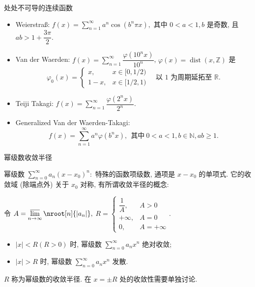 
\begin{frame}{处处不可导的连续函数}

\begin{itemize}[<+->]
\item Weierstra\ss: $f(x) = \sum\limits_{n=1}^\infty a^n \cos(b^n \pi x),$ 其中 $0 < a < 1, b$ 是奇数, 且 $ab > 1 + \dfrac{3\pi}{2}.$
\item Van der Waerden: $f(x) = \sum\limits_{n=1}^\infty \dfrac{\varphi(10^n x)}{10^n}$, $\varphi(x) = \operatorname{dist}(x, \mathbb{Z})$ 是
\[\varphi_0(x) = \begin{cases} x, & x \in [0, 1/2) \\ 1-x, & x \in [1/2, 1) \end{cases} \quad \text{以 $1$ 为周期延拓至 $\mathbb{R}$}.\]
\item Teiji Takagi: $f(x) = \sum\limits_{n=1}^\infty \dfrac{\varphi(2^n x)}{2^n}.$
\item Generalized Van der Waerden-Takagi:
\[f(x) = \sum\limits_{n=1}^\infty a^n \varphi(b^n x), ~~ \text{其中} ~ 0 < a < 1, b \in \mathbb{N}, ab \geqslant 1.\]
\end{itemize}

\end{frame}


\begin{frame}{幂级数收敛半径}

幂级数 $\sum\limits_{n=0}^\infty a_n (x-x_0)^n:$ 特殊的函数项级数, 通项是 $x-x_0$ 的单项式. 它的收敛域 (除端点外) 关于 $x_0$ 对称, 有所谓\alert{收敛半径}的概念:

\pause

\begin{thm}
令 $A = \varlimsup\limits_{n\to\infty} \nroot[n]{\lvert a_n \rvert},$ $R = \begin{cases} \dfrac{1}{A}, & A > 0 \\ +\infty, & A = 0 \\ 0, & A = +\infty \end{cases}.$
\begin{itemize}
\item $\lvert x \rvert < R (R > 0)$ 时, 幂级数 $\sum\limits_{n=0}^\infty a_n x^n$ 绝对收敛;
\item $\lvert x \rvert > R$ 时, 幂级数 $\sum\limits_{n=0}^\infty a_n x^n$ 发散.
\end{itemize}
\end{thm}

\pause

$R$ 称为幂级数的收敛半径. 在 $x = \pm R$ 处的收敛性需要单独讨论.

\end{frame}

